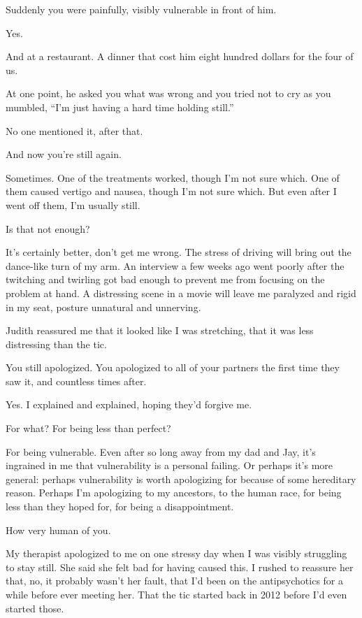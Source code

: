 \begin{paracol}{2}
\begin{leftcolumn}
\begin{ally}
Suddenly you were painfully, visibly vulnerable in front of him.
\end{ally}
Yes.

And at a restaurant. A dinner that cost him eight hundred dollars for the four of us.

\begin{ally}
At one point, he asked you what was wrong and you tried not to cry as you mumbled, ``I'm just having a hard time holding still.''
\end{ally}
No one mentioned it, after that.
\newpage

\begin{ally}
And now you're still again.
\end{ally}
Sometimes. One of the treatments worked, though I'm not sure which. One of them caused vertigo and nausea, though I'm not sure which. But even after I went off them, I'm usually still.

\begin{ally}
Is that not enough?
\end{ally}
It's certainly better, don't get me wrong. The stress of driving will bring out the dance-like turn of my arm. An interview a few weeks ago went poorly after the twitching and twirling got bad enough to prevent me from focusing on the problem at hand. A distressing scene in a movie will leave me paralyzed and rigid in my seat, posture unnatural and unnerving.

Judith reassured me that it looked like I was stretching, that it was less distressing than the tic.

\begin{ally}
You still apologized. You apologized to all of your partners the first time they saw it, and countless times after.
\end{ally}
Yes. I explained and explained, hoping they'd forgive me.

\begin{ally}
For what? For being less than perfect?
\end{ally}
For being vulnerable. Even after so long away from my dad and Jay, it's ingrained in me that vulnerability is a personal failing. Or perhaps it's more general: perhaps vulnerability is worth apologizing for because of some hereditary reason. Perhaps I'm apologizing to my ancestors, to the human race, for being less than they hoped for, for being a disappointment.

\begin{ally}
How very human of you.
\end{ally}
My therapist apologized to me on one stressy day when I was visibly struggling to stay still. She said she felt bad for having caused this. I rushed to reassure her that, no, it probably wasn't her fault, that I'd been on the antipsychotics for a while before ever meeting her. That the tic started back in 2012 before I'd even started those.


\end{leftcolumn}
\end{paracol}
